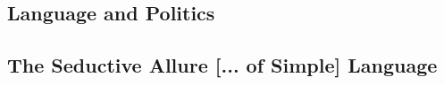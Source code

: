 \subsection{Language and Politics}
\subsection{The Seductive Allure [... of Simple] Language}



  







